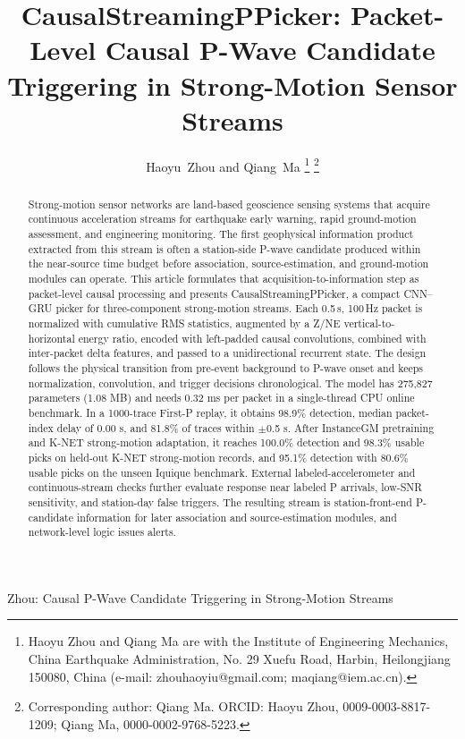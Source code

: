 \documentclass[journal]{IEEEtran}
\newcommand{\model}{CausalStreamingPPicker\xspace}
\newcommand{\modelv}{CausalStreamingPPicker\xspace}
\newcommand{\chunk}{0.5\,s\xspace}
\newcommand{\sr}{100\,Hz\xspace}
\begin{document}
\title{\model: Packet-Level Causal P-Wave Candidate Triggering in Strong-Motion Sensor Streams}

\author{Haoyu~Zhou and Qiang~Ma%
\thanks{Haoyu Zhou and Qiang Ma are with the Institute of Engineering Mechanics, China Earthquake Administration, No. 29 Xuefu Road, Harbin, Heilongjiang 150080, China (e-mail: zhouhaoyiu@gmail.com; maqiang@iem.ac.cn).}
\thanks{Corresponding author: Qiang Ma. ORCID: Haoyu Zhou, 0009-0003-8817-1209; Qiang Ma, 0000-0002-9768-5223.}
}

%
{Zhou: Causal P-Wave Candidate Triggering in Strong-Motion Streams}

\maketitle

\begin{abstract}
Strong-motion sensor networks are land-based geoscience sensing systems that acquire continuous acceleration streams for earthquake early warning, rapid ground-motion assessment, and engineering monitoring. The first geophysical information product extracted from this stream is often a station-side P-wave candidate produced within the near-source time budget before association, source-estimation, and ground-motion modules can operate. This article formulates that acquisition-to-information step as packet-level causal processing and presents \modelv, a compact CNN--GRU picker for three-component strong-motion streams. Each \chunk, \sr packet is normalized with cumulative RMS statistics, augmented by a Z/NE vertical-to-horizontal energy ratio, encoded with left-padded causal convolutions, combined with inter-packet delta features, and passed to a unidirectional recurrent state. The design follows the physical transition from pre-event background to P-wave onset and keeps normalization, convolution, and trigger decisions chronological. The model has 275,827 parameters (1.08 MB) and needs 0.32 ms per packet in a single-thread CPU online benchmark. In a 1000-trace First-P replay, it obtains 98.9\% detection, median packet-index delay of 0.00 s, and 81.8\% of traces within $\pm$0.5 s. After InstanceGM pretraining and K-NET strong-motion adaptation, it reaches 100.0\% detection and 98.3\% usable picks on held-out K-NET strong-motion records, and 95.1\% detection with 80.6\% usable picks on the unseen Iquique benchmark. External labeled-accelerometer and continuous-stream checks further evaluate response near labeled P arrivals, low-SNR sensitivity, and station-day false triggers. The resulting stream is station-front-end P-candidate information for later association and source-estimation modules, and network-level logic issues alerts.
\end{abstract}
\end{document}
